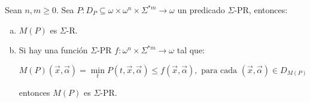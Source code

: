  \begin{lemma}
    \PN Sean $n, m \geq 0$. Sea $P: D_{P} \subseteq \omega \times \omega^{n} \times \Sigma^{\ast m} \rightarrow \omega$
    un predicado $\Sigma$-PR, entonces:

    \begin{enumerate}[a)]
      \item $M(P)$ es $\Sigma$-R.
      \item Si hay una función $\Sigma$-PR $f: \omega^{n} \times \Sigma^{\ast m} \rightarrow \omega$ tal que:

        \[
          M(P)(\vec{x},\vec{\alpha}) = \min_{t}P(t,\vec{x},\vec{\alpha}) \leq f(\vec{x},\vec{\alpha}),
          \text{ para cada }(\vec{x},\vec{\alpha}) \in D_{M(P)}
        \]

        \PN entonces $M(P)$ es $\Sigma$-PR.
    \end{enumerate}
  \end{lemma}
